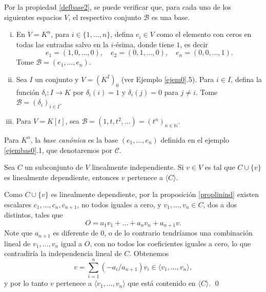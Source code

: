 \begin{ejem}\label{ejembas0}
Por la propiedad \ref{defbase2}, se puede verificar que, para cada uno de los siguientes espacios $V$, el respectivo conjunto $\mathcal{B}$ es una base.
\begin{enumerate}[(i)]
\item En $V=K^n$, para $i\in\{1,\ldots, n\}$, defina $e_i\in V$ como el elemento con ceros en todas las entradas salvo en la $i$-\'esima, donde tiene $1$, es decir
$$e_1=(1,0,\ldots,0),\quad e_2=(0,1,\ldots,0),\quad e_n=(0,0,\ldots,1).$$
Tome $\mathcal{B}=(e_1,\ldots,e_n)$.
\item Sea $I$ un conjunto y $V=\left(K^I\right)_0$ (ver Ejemplo \ref{ejem0}.5). Para $i\in I$, defina la funci\'on $\delta_i: I\rightarrow K$ por $\delta_i(i)=1$ y $\delta_i(j)=0$ para $j\ne i$. Tome $\mathcal{B}=(\delta_i)_{i\in I}$. 
\item Para $V=K[t]$, sea $\mathcal{B}=(1,t,t^2,\ldots)=(t^n)_{n\in\mathbb{N}}$.
\end{enumerate}
\end{ejem}

\begin{nota}
Para $K^n$, la \emph{base can\'onica} es la base $(e_1,\ldots,e_n)$ definida en el ejemplo \ref{ejembas0}.1, que denotaremos por $\mathcal{C}$.
\end{nota}

\begin{lema}\label{inddep}
Sea $C$ un subconjunto de $V$ linealmente independiente. Si $v\in V$ es tal que $C\cup\{v\}$ es linealmente dependiente, entonces $v$ pertenece a $\langle C\rangle$.
\end{lema}

\dem Como $C\cup\{v\}$ es linealmente dependiente, por la proposici\'on \ref{proplinind} existen escalares $c_1,\ldots,c_n,c_{n+1}$, no todos iguales a cero, y $v_1,\ldots,v_n\in C$, dos a dos distintos, tales que
\[
O=a_1v_1+\ldots+a_nv_n+a_{n+1}v.
\]
Note que $a_{n+1}$ es diferente de $0$, o de lo contrario tendr\'iamos una combinaci\'on lineal de $v_1,\ldots,v_n$ igual a $O$, con no todos los coeficientes iguales a cero, lo que contradiría la independencia lineal de $C$. Obtenemos
\[
v=\sum_{i=1}^n(-a_i/a_{n+1})v_i\in\langle v_1,\ldots,v_n\rangle,
\]
y por lo tanto $v$ pertenece a $\langle v_1,\ldots,v_n\rangle$ que está contenido en $\langle C\rangle$. \qed

